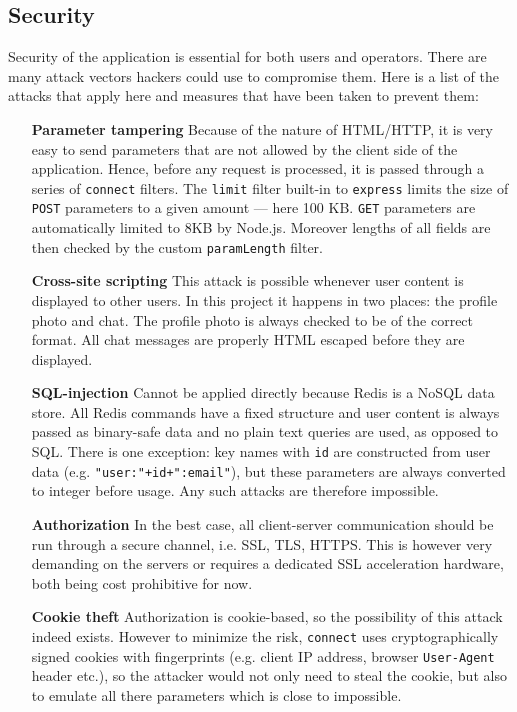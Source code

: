 \documentclass[12pt,oneside]{fithesis}
\begin{document}
	\subsection{Security}
		Security of the application is essential for both users and operators. There are many attack vectors hackers could use to compromise them. \cite{paper:dd} Here is a list of the attacks that apply here and measures that have been taken to prevent them:
		\begin{itemize}
			\item[\textbf{Parameter tampering}] 
				Because of the nature of HTML/HTTP, it is very easy to send parameters that are not allowed by the client side of the application. Hence, before any request is processed, it is passed through a series of \texttt{connect} filters. The \texttt{limit} filter built-in to \texttt{express} limits the size of \texttt{POST} parameters to a given amount --- here 100 KB. \texttt{GET} parameters are automatically limited to 8KB by Node.js. Moreover lengths of all fields are then checked by the custom \texttt{paramLength} filter. 
			\item[\textbf{Cross-site scripting}] 
				This attack is possible whenever user content is displayed to other users. In this project it happens in two places: the profile photo and chat. The profile photo is always checked to be of the correct format. All chat messages are properly HTML escaped before they are displayed.
			\item[\textbf{SQL-injection}]
				Cannot be applied directly because Redis is a NoSQL data store. All Redis commands have a fixed structure and user content is always passed as binary-safe data and no plain text queries are used, as opposed to SQL. There is one exception: key names with \texttt{id} are constructed from user data (e.g. \texttt{"user:"+id+":email"}), but these parameters are always converted to integer before usage. Any such attacks are therefore impossible.
			\item[\textbf{Authorization}] In the best case, all client-server communication should be run through a secure channel, i.e. SSL, TLS, HTTPS. This is however very demanding on the servers or requires a dedicated SSL acceleration hardware, both being cost prohibitive for now.
			\item[\textbf{Cookie theft}]
				Authorization is cookie-based, so the possibility of this attack indeed exists. However to minimize the risk, \texttt{connect} uses cryptographically signed cookies with fingerprints (e.g. client IP address, browser \texttt{User-Agent} header etc.), so the attacker would not only need to steal the cookie, but also to emulate all there parameters which is close to impossible.				
		\end{itemize}		
\end{document}
